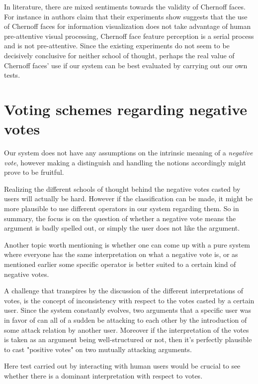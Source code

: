 \documentclass{article}
\begin{document}
In literature, there are mixed sentiments towards the validity of Chernoff faces. For instance in \cite{Morris00} authors claim that their experiments show suggests that the use of Chernoff faces for information visualization does not take advantage of human pre-attentive visual processing, Chernoff face feature perception is a serial process and is not pre-attentive.  Since the existing experiments do not seem to be decisively conclusive for neither school of thought, perhaps the real value of Chernoff faces' use if our system can be best evaluated by carrying out our own tests.


\section{Voting schemes regarding negative votes}
Our system does not have any assumptions on the intrinsic meaning of a \textit{negative vote}, however making a distinguish and handling the notions accordingly might prove to be fruitful.

Realizing the different schools of thought behind the negative votes casted by users will actually be hard. However if the classification can be made, it might be more plausible to use different operators in our system regarding them. So in summary, the focus is on the question of whether a negative vote means the argument is badly spelled out, or simply the user does not like the argument. 

Another topic worth mentioning is whether one can come up with a pure system where everyone has the same interpretation on what a negative vote is, or as mentioned earlier some specific operator is better suited to a certain kind of negative votes.

A challenge that transpires by the discussion of the different interpretations of votes, is the concept of inconsistency with respect to the votes casted by a certain user. Since the system constantly evolves, two arguments that a specific user was in favor of can all of a sudden be attacking to each other by the introduction of some attack relation by another user. Moreover if the interpretation of the votes is taken as an argument being well-structured or not, then it's perfectly plausible to cast "positive votes" on two mutually attacking arguments.

Here test carried out by interacting with human users would be crucial to see whether there is a dominant interpretation with respect to votes. 
\end{document}
